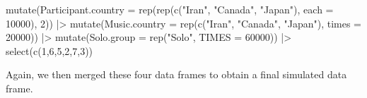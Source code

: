 \documentclass[
  bookmarksnumbered]{article}
\newenvironment{Shaded}{\begin{snugshade}}{\end{snugshade}}
\newcommand{\AttributeTok}[1]{\textcolor[rgb]{0.80,0.80,0.80}{#1}}
\newcommand{\DecValTok}[1]{\textcolor[rgb]{0.86,0.86,0.80}{#1}}
\newcommand{\FunctionTok}[1]{\textcolor[rgb]{0.94,0.94,0.56}{#1}}
\newcommand{\NormalTok}[1]{\textcolor[rgb]{0.80,0.80,0.80}{#1}}
\newcommand{\SpecialCharTok}[1]{\textcolor[rgb]{0.86,0.64,0.64}{#1}}
\newcommand{\StringTok}[1]{\textcolor[rgb]{0.80,0.58,0.58}{#1}}
\begin{document}
\begin{Shaded}
\begin{Highlighting}[]
  \FunctionTok{mutate}\NormalTok{(}\AttributeTok{Participant.country =} \FunctionTok{rep}\NormalTok{(}\FunctionTok{rep}\NormalTok{(}\FunctionTok{c}\NormalTok{(}\StringTok{"Iran"}\NormalTok{, }\StringTok{"Canada"}\NormalTok{, }\StringTok{"Japan"}\NormalTok{), }\AttributeTok{each =} \DecValTok{10000}\NormalTok{), }\DecValTok{2}\NormalTok{)) }\SpecialCharTok{|\textgreater{}}
  \FunctionTok{mutate}\NormalTok{(}\AttributeTok{Music.country =} \FunctionTok{rep}\NormalTok{(}\FunctionTok{c}\NormalTok{(}\StringTok{"Iran"}\NormalTok{, }\StringTok{"Canada"}\NormalTok{, }\StringTok{"Japan"}\NormalTok{), }\AttributeTok{times =} \DecValTok{20000}\NormalTok{)) }\SpecialCharTok{|\textgreater{}}
  \FunctionTok{mutate}\NormalTok{(}\AttributeTok{Solo.group =} \FunctionTok{rep}\NormalTok{(}\StringTok{"Solo"}\NormalTok{, }\AttributeTok{TIMES =} \DecValTok{60000}\NormalTok{)) }\SpecialCharTok{|\textgreater{}}
  \FunctionTok{select}\NormalTok{(}\FunctionTok{c}\NormalTok{(}\DecValTok{1}\NormalTok{,}\DecValTok{6}\NormalTok{,}\DecValTok{5}\NormalTok{,}\DecValTok{2}\NormalTok{,}\DecValTok{7}\NormalTok{,}\DecValTok{3}\NormalTok{))}
\end{Highlighting}
\end{Shaded}

Again, we then merged these four data frames to obtain a final simulated data frame.
\end{document}
